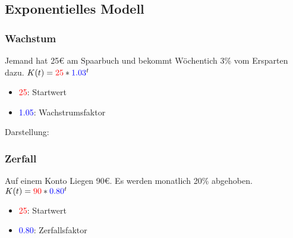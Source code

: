 \newpage
\subsection{Exponentielles Modell}

\subsubsection{Wachstum}
\hfill \break
Jemand hat 25€ am Spaarbuch und bekommt Wöchentich 3\% vom Ersparten dazu.
\hfill \break
$K(t)=\textcolor{red}{25}*\textcolor{blue}{1.03}^t$

\begin{itemize}
    \item \textcolor{red}{25}: Startwert
    \item \textcolor{blue}{1.05}: Wachstrumsfaktor
\end{itemize}

\hfill \break
Darstellung:\\

\newpage
\subsubsection{Zerfall}

\hfill \break
Auf einem Konto Liegen 90€. Es werden monatlich 20\% abgehoben.
\hfill \break
$K(t)=\textcolor{red}{90}*\textcolor{blue}{0.80}^t$

\begin{itemize}
    \item \textcolor{red}{25}: Startwert
    \item \textcolor{blue}{0.80}: Zerfallsfaktor
\end{itemize}

